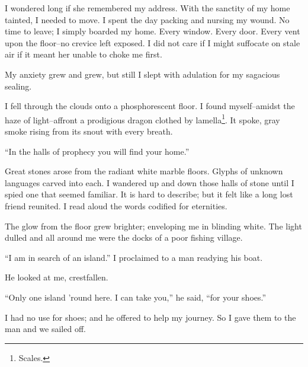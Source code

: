\documentclass{article}
\begin{document}
I wondered long if she remembered my address.
With the sanctity of my home tainted, I needed to move.
I spent the day packing and nursing my wound.
No time to leave; I simply boarded my home. Every
window. Every door. Every vent upon the floor--no
crevice left exposed.
I did not care if I might suffocate on stale air if
it meant her unable to choke me first.


My anxiety grew and grew, but still I slept
with adulation for my sagacious sealing.
\vvvv


\noindent
I fell through the clouds onto a phosphorescent floor.
I found myself--amidst the haze of light--affront
a prodigious dragon clothed by lamella\footnote{Scales.}. %
It spoke, gray smoke rising from its snout with every breath.
\VV


``In the halls of prophecy you will find your home.''
\VV


\noindent
Great stones arose from the radiant white marble floors.
Glyphs of unknown languages carved into each.
I wandered up and down those halls of stone
until I spied one that seemed familiar.
It is hard to describe; but it felt like a long lost friend
reunited.  I read aloud the words codified for eternities.
\VV




\noindent
The glow from the floor grew brighter;
enveloping me in blinding white.
The light dulled and
all around me were the docks of a poor fishing village.
\VV


``I am in search of an island.''
I proclaimed to a man readying his boat.
\VV


\noindent
He looked at me, crestfallen.
\VV


``Only one island 'round here.
I can take you,'' he said, ``for your shoes.''
\VV


\noindent
I had no use for shoes; and he offered to help my journey.
So I gave them to the man and we sailed off.
\end{document}
